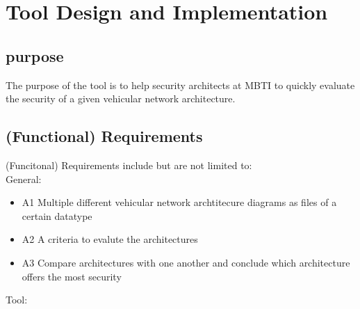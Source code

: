 \chapter{Tool Design and Implementation}
\label{chp:tool}

\section{purpose}\label{sec:purpose}

The purpose of the tool is to help security architects at MBTI to quickly evaluate 
the security of a given vehicular network architecture.

\section{(Functional) Requirements}\label{sec:funct-req}

(Funcitonal) Requirements include but are not limited to:\\

General:

\begin{itemize}
	\item A1\label{sec:a1} Multiple different vehicular network archtitecure diagrams as files of a certain datatype
	\item A2\label{sec:a2} A criteria to evalute the architectures
	\item A3\label{sec:a3} Compare architectures with one another and conclude which architecture offers the most security
\end{itemize}

Tool:

